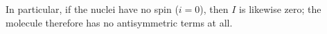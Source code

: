 In particular, if the nuclei have no spin ($i=0$), then $I$ is likewise zero; the molecule therefore has no antisymmetric terms at all.
